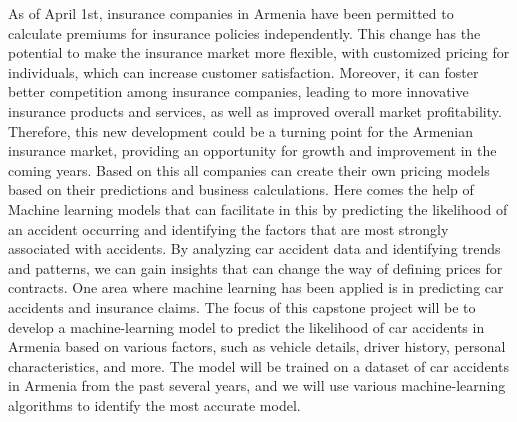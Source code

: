 \documentclass{IEEEtran}
\begin{document}
As of April 1st, insurance companies in Armenia have been permitted to calculate premiums for insurance policies independently. This change has the potential to make the insurance market more flexible, with customized pricing for individuals, which can increase customer satisfaction. Moreover, it can foster better competition among insurance companies, leading to more innovative insurance products and services, as well as improved overall market profitability. Therefore, this new development could be a turning point for the Armenian insurance market, providing an opportunity for growth and improvement in the coming years. Based on this all companies can create their own pricing models based on their predictions and business calculations. Here comes the help of Machine learning models that can facilitate in this by predicting the likelihood of an accident occurring and identifying the factors that are most strongly associated with accidents. By analyzing car accident data and identifying trends and patterns, we can gain insights that can change the way of defining prices for contracts. One area where machine learning has been applied is in predicting car accidents and insurance claims. The focus of this capstone project will be to develop a machine-learning model to predict the likelihood of car accidents in Armenia based on various factors, such as vehicle details, driver history, personal characteristics, and more. The model will be trained on a dataset of car accidents in Armenia from the past several years, and we will use various machine-learning algorithms to identify the most accurate model.
\end{document}
